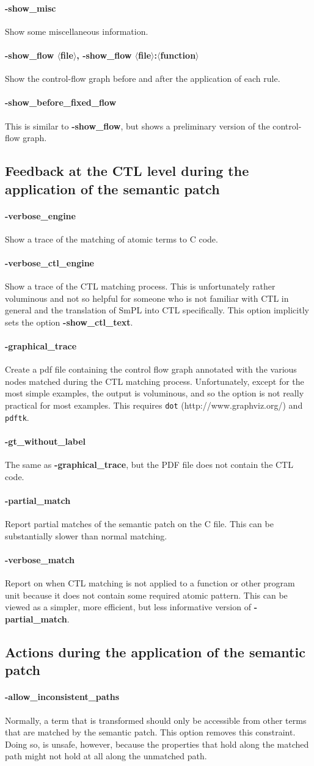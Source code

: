 \documentclass{article}
\newcommand{\normal}[2]{\paragraph*{\makebox[0in][r]{\BigLowerDiamond\,\,} {{#1}}} {#2}}
\newcommand{\rare}[2]{\paragraph*{\makebox[0in][r]{\BigDiamondshape\,\,} {{#1}}} {#2}}
\newcommand{\developer}[2]{\paragraph*{{#1}} {#2}}
\begin{document}
\normal{-show\_misc}{Show some miscellaneous information.}

\rare{-show\_flow $\langle$file$\rangle$, -show\_flow
  $\langle$file$\rangle$:$\langle$function$\rangle$} Show the control-flow
graph before and after the application of each rule.

\developer{-show\_before\_fixed\_flow}{This is similar to {\bf
    -show\_flow}, but shows a preliminary version of the control-flow graph.}

\subsection{Feedback at the CTL level during the application of the
  semantic patch}

\normal{-verbose\_engine}{Show a trace of the matching of atomic terms to C
  code.}

\rare{-verbose\_ctl\_engine}{Show a trace of the CTL matching process.
  This is unfortunately rather voluminous and not so helpful for someone
  who is not familiar with CTL in general and the translation of SmPL into
  CTL specifically.  This option implicitly sets the option {\bf
    -show\_ctl\_text}.}

\rare{-graphical\_trace}{Create a pdf file containing the control flow
  graph annotated with the various nodes matched during the CTL matching
  process.  Unfortunately, except for the most simple examples, the output
  is voluminous, and so the option is not really practical for most
  examples.  This requires {\tt dot} (http://www.graphviz.org/) and {\tt
  pdftk}.}

\rare{-gt\_without\_label}{The same as {\bf -graphical\_trace}, but the PDF
  file does not contain the CTL code.}

\rare{-partial\_match}{
Report partial matches of the semantic patch on the C file.  This can
  be substantially slower than normal matching.}

\rare{-verbose\_match}{
Report on when CTL matching is not applied to a function or other program
unit because it does not contain some required atomic pattern.
This can be viewed as a simpler, more efficient, but less informative
version of {\bf -partial\_match}.}

\subsection{Actions during the application of the semantic patch}

\rare{-allow\_inconsistent\_paths}{Normally, a term that is transformed
  should only be accessible from other terms that are matched by the
  semantic patch.  This option removes this constraint.  Doing so, is
  unsafe, however, because the properties that hold along the matched path
  might not hold at all along the unmatched path.}
\end{document}
